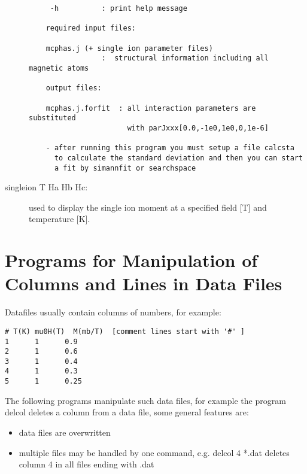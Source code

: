 \begin{description}
\begin{verbatim}
     -h          : print help message

    required input files:

    mcphas.j (+ single ion parameter files)
                 :  structural information including all magnetic atoms

    output files:

    mcphas.j.forfit  : all interaction parameters are substituted
                       with parJxxx[0.0,-1e0,1e0,0,1e-6]

    - after running this program you must setup a file calcsta 
      to calculate the standard deviation and then you can start
      a fit by simannfit or searchspace
\end{verbatim}
\item [\prg singleion\index{singleion} T Ha Hb Hc:] used to display the single %
ion moment at a specified field [T] and temperature [K].
\end{description} 

\section{Programs for Manipulation of Columns and Lines in Data Files}

Datafiles usually contain columns of numbers, for example:

\begin{verbatim}
# T(K) mu0H(T)  M(mb/T)  [comment lines start with '#' ]
1      1      0.9
2      1      0.6
3      1      0.4
4      1      0.3
5      1      0.25
\end{verbatim}

The following programs manipulate such data files, for example
the program {\prg delcol} deletes a column from a data file,
some general features are:
\begin{itemize}
\item data files are overwritten 
\item multiple files may be handled by one command, e.g. {\prg delcol 4 *.dat} deletes column 4 %
in all 
files ending with .dat
\end{itemize}

